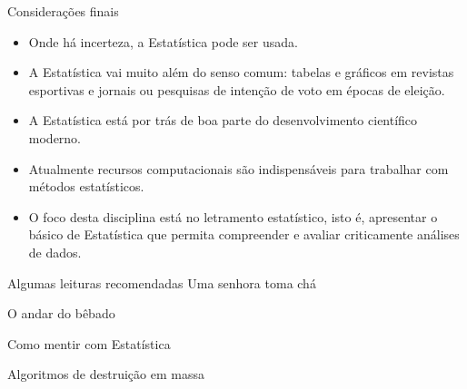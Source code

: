 \documentclass[
  ignorenonframetext,
  serif,
  professionalfont,
  usenames,
  dvipsnames,
  aspectratio = 169]{beamer}
\begin{document}
\begin{frame}{Considerações finais}
\protect\hypertarget{considerauxe7uxf5es-finais}{}
\begin{itemize}
\item
  Onde há incerteza, a Estatística pode ser usada.
\item
  A Estatística vai muito além do senso comum: tabelas e gráficos em
  revistas esportivas e jornais ou pesquisas de intenção de voto em
  épocas de eleição.
\item
  A Estatística está por trás de boa parte do desenvolvimento científico
  moderno.
\item
  Atualmente recursos computacionais são indispensáveis para trabalhar
  com métodos estatísticos.
\item
  O foco desta disciplina está no letramento estatístico, isto é,
  apresentar o básico de Estatística que permita compreender e avaliar
  criticamente análises de dados.
\end{itemize}
\end{frame}

\begin{frame}{Algumas leituras recomendadas}
\protect\hypertarget{algumas-leituras-recomendadas}{}
Uma senhora toma chá

O andar do bêbado

Como mentir com Estatística

Algoritmos de destruição em massa
\end{frame}
\end{document}
